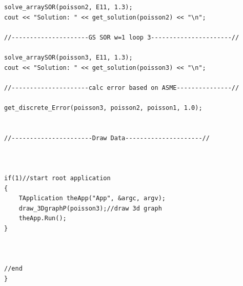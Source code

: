 \documentclass[paper=a4, fontsize=11pt, abstract=on]{scrartcl}
\numberwithin{equation}{section}		%
\numberwithin{figure}{section}			%
\numberwithin{table}{section}				%
\begin{document}
\begin{lstlisting}
solve_arraySOR(poisson2, E11, 1.3);
cout << "Solution: " << get_solution(poisson2) << "\n";

//---------------------GS SOR w=1 loop 3----------------------//

solve_arraySOR(poisson3, E11, 1.3);
cout << "Solution: " << get_solution(poisson3) << "\n";

//---------------------calc error based on ASME---------------//

get_discrete_Error(poisson3, poisson2, poisson1, 1.0);


//----------------------Draw Data---------------------//



if(1)//start root application
{
	TApplication theApp("App", &argc, argv);
	draw_3DgraphP(poisson3);//draw 3d graph
	theApp.Run();
}



//end
}



\end{lstlisting}
\end{document}
